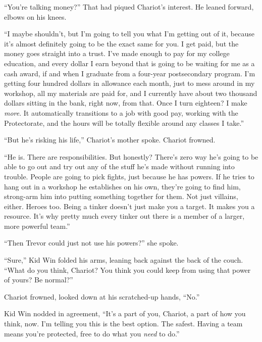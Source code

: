 ``You're talking money?'' That had piqued Chariot's interest.  He leaned forward, elbows on his knees.



``I maybe shouldn't, but I'm going to tell you what I'm getting out of it, because it's almost definitely going to be the exact same for you.  I get paid, but the money goes straight into a trust.  I've made enough to pay for my college education, and every dollar I earn beyond that is going to be waiting for me as a cash award, if and when I graduate from a four-year postsecondary program.  I'm getting four hundred dollars in allowance each month, just to mess around in my workshop, all my materials are paid for, and I currently have about two thousand dollars sitting in the bank, right now, from that.  Once I turn eighteen?  I make \emph{more}.  It automatically transitions to a job with good pay, working with the Protectorate, and the hours will be totally flexible around any classes I take.''



``But he's risking his life,'' Chariot's mother spoke.  Chariot frowned.



``He is.  There are responsibilities.  But honestly?  There's zero way he's going to be able to go out and try out any of the stuff he's made without running into trouble.  People are going to pick fights, just because he has powers.  If he tries to hang out in a workshop he establishes on his own, they're going to find him, strong-arm him into putting something together for them.  Not just villains, either.  Heroes too.  Being a tinker doesn't just make you a target.  It makes you a resource.  It's why pretty much every tinker out there is a member of a larger, more powerful team.''



``Then Trevor could just not use his powers?'' she spoke.



``Sure,'' Kid Win folded his arms, leaning back against the back of the couch.  ``What do you think, Chariot?  You think you could keep from using that power of yours?  Be normal?''



Chariot frowned, looked down at his scratched-up hands, ``No.''



Kid Win nodded in agreement, ``It's a part of you, Chariot, a part of how you think, now.  I'm telling you this is the best option.  The safest.  Having a team means you're protected, free to do what you \emph{need} to do.''



